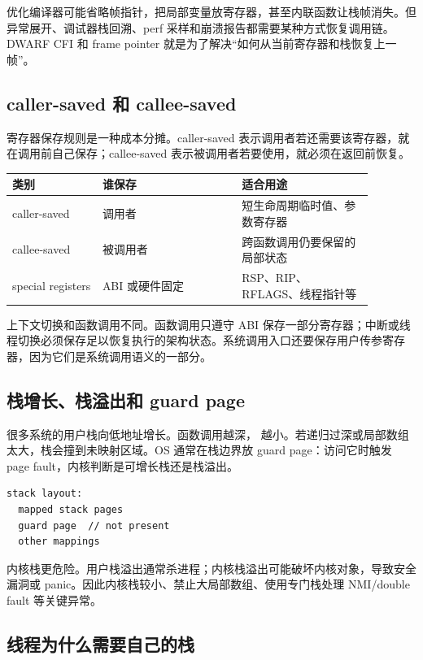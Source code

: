 优化编译器可能省略帧指针，把局部变量放寄存器，甚至内联函数让栈帧消失。但异常展开、调试器栈回溯、perf 采样和崩溃报告都需要某种方式恢复调用链。DWARF CFI 和 frame pointer 就是为了解决“如何从当前寄存器和栈恢复上一帧”。

\subsection{caller-saved 和 callee-saved}

寄存器保存规则是一种成本分摊。caller-saved 表示调用者若还需要该寄存器，就在调用前自己保存；callee-saved 表示被调用者若要使用，就必须在返回前恢复。

\begin{longtable}{p{0.22\linewidth}p{0.34\linewidth}p{0.32\linewidth}}
\toprule
类别 & 谁保存 & 适合用途 \\
\midrule
caller-saved & 调用者 & 短生命周期临时值、参数寄存器 \\
callee-saved & 被调用者 & 跨函数调用仍要保留的局部状态 \\
special registers & ABI 或硬件固定 & RSP、RIP、RFLAGS、线程指针等 \\
\bottomrule
\end{longtable}

上下文切换和函数调用不同。函数调用只遵守 ABI 保存一部分寄存器；中断或线程切换必须保存足以恢复执行的架构状态。系统调用入口还要保存用户传参寄存器，因为它们是系统调用语义的一部分。

\subsection{栈增长、栈溢出和 guard page}

很多系统的用户栈向低地址增长。函数调用越深， 越小。若递归过深或局部数组太大，栈会撞到未映射区域。OS 通常在栈边界放 guard page：访问它时触发 page fault，内核判断是可增长栈还是栈溢出。

\begin{lstlisting}
stack layout:
  mapped stack pages
  guard page  // not present
  other mappings
\end{lstlisting}

内核栈更危险。用户栈溢出通常杀进程；内核栈溢出可能破坏内核对象，导致安全漏洞或 panic。因此内核栈较小、禁止大局部数组、使用专门栈处理 NMI/double fault 等关键异常。

\subsection{线程为什么需要自己的栈}

